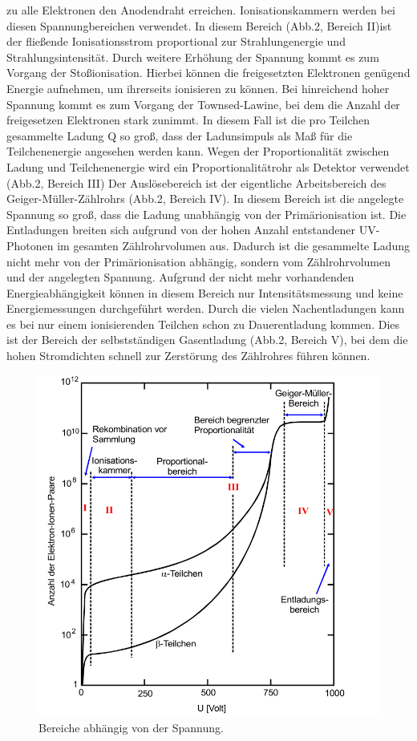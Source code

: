 zu alle Elektronen den Anodendraht erreichen. Ionisationskammern werden bei diesen Spannungbereichen verwendet.
In diesem Bereich (Abb.2, Bereich II)ist der fließende Ionisationsstrom proportional zur Strahlungenergie und Strahlungsintensität.
\newline
Durch weitere Erhöhung der Spannung kommt es zum Vorgang der Stoßionisation. Hierbei können die freigesetzten
Elektronen genügend Energie aufnehmen, um ihrerseits ionisieren zu können. Bei hinreichend hoher Spannung kommt
es zum Vorgang der Townsed-Lawine, bei dem die Anzahl der freigesetzen Elektronen stark zunimmt.
In diesem Fall ist die pro Teilchen gesammelte Ladung Q so groß, dass der Ladunsimpuls als Maß für
die Teilchenenergie angesehen werden kann. Wegen der Proportionalität zwischen Ladung und Teilchenenergie
wird ein Proportionalitätrohr als Detektor verwendet (Abb.2, Bereich III)
\newline
Der Auslösebereich ist der eigentliche Arbeitsbereich des Geiger-Müller-Zählrohrs (Abb.2, Bereich IV). In diesem Bereich ist
die angelegte Spannung so groß, dass die Ladung unabhängig von der Primärionisation ist. Die Entladungen
breiten sich aufgrund von der hohen Anzahl entstandener UV-Photonen im gesamten Zählrohrvolumen aus. Dadurch
ist die gesammelte Ladung nicht mehr von der Primärionisation abhängig, sondern vom Zählrohrvolumen und der
angelegten Spannung. Aufgrund der nicht mehr vorhandenden Energieabhängigkeit können in diesem Bereich nur
Intensitätsmessung und keine Energiemessungen durchgeführt werden.
\newline
Durch die vielen Nachentladungen kann es bei nur einem ionisierenden Teilchen schon zu Dauerentladung kommen.
Dies ist der Bereich der selbstständigen Gasentladung (Abb.2, Bereich V), bei dem die hohen
Stromdichten schnell zur Zerstörung des Zählrohres führen können.
\begin{figure}
  \centering
  \includegraphics[scale=0.49]{bereiche.png}
  \caption{Bereiche abhängig von der Spannung.\cite{anleitung}}
  \label{fig:Bereiche}
\end{figure}
\newpage
